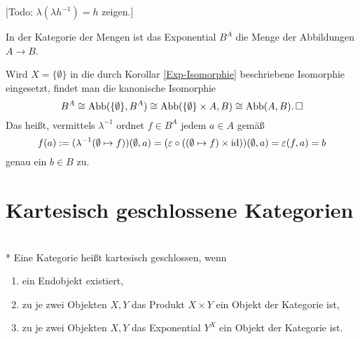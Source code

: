[Todo: $\lambda(\lambda h^{-1})=h$ zeigen.]\,\qedsymbol

\begin{Korollar}
In der Kategorie der Mengen ist das Exponential $B^A$ die Menge
der Abbildungen $A\to B$.
\end{Korollar}

\noindent{} Wird $X=\{\emptyset\}$ in die durch Korollar
\ref{Exp-Isomorphie} beschriebene Isomorphie eingesetzt, findet
man die kanonische Isomorphie
\[B^A\cong\operatorname{Abb}(\{\emptyset\},B^A)\cong\operatorname{Abb}(\{\emptyset\}\times A, B)
\cong\operatorname{Abb}(A, B).\,\Box\]
Das heißt, vermittels $\lambda^{-1}$ ordnet $f\in B^A$ jedem $a\in A$
gemäß
\[f(a) := (\lambda^{-1}(\emptyset\mapsto f))(\emptyset,a)
= (\varepsilon\circ ((\emptyset\mapsto f)\times\operatorname{id}))(\emptyset,a)
= \varepsilon(f,a) = b\]
genau ein $b\in B$ zu.

\section{Kartesisch geschlossene Kategorien}

\begin{Definition}\mbox{}\\*
Eine Kategorie heißt kartesisch geschlossen, wenn
\begin{enumerate}
\item ein Endobjekt existiert,
\item zu je zwei Objekten $X,Y$ das Produkt $X\times Y$ ein Objekt der Kategorie ist,
\item zu je zwei Objekten $X,Y$ das Exponential $Y^X$  ein Objekt der Kategorie ist.
\end{enumerate}
\end{Definition}
